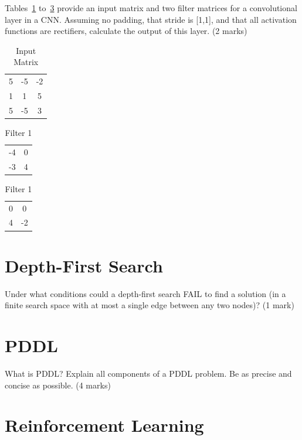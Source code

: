 \documentclass{article}
\begin{document}
Tables~\ref{CNN1} to~\ref{CNN3} provide an input matrix and two filter matrices for a convolutional layer in a CNN. Assuming no padding, that stride is [1,1], and that all activation functions are rectifiers, calculate the output of this layer. (2 marks)
\begin{table}[h!]
\caption{Input Matrix}
\label{CNN1}
\begin{center}
\begin{tabular}{ |c|c|c| } 
\hline
5  &  -5  &  -2 \\
1  &  1  &  5 \\
5  &  -5  &  3 \\
\hline
\end{tabular}
\end{center}
\end{table}
\begin{table}[h!]
\caption{Filter 1}
\label{CNN2}
\begin{center}
\begin{tabular}{ |c|c| } 
\hline
-4  &  0 \\
-3  &  4 \\
\hline
\end{tabular}
\end{center}
\end{table}
\begin{table}[h!]
\caption{Filter 1}
\label{CNN3}
\begin{center}
\begin{tabular}{ |c|c| } 
\hline
0  &  0 \\
4  &  -2 \\
\hline
\end{tabular}
\end{center}
\end{table}
\clearpage
\section{ Depth-First Search }

Under what conditions could a depth-first search FAIL to find a solution (in a finite search space with at most a single edge between any two nodes)? (1 mark)\clearpage
\section{ PDDL }

What is PDDL? Explain all components of a PDDL problem. Be as precise and concise as possible.  (4 marks)
\clearpage
\section{ Reinforcement Learning }
\end{document}
